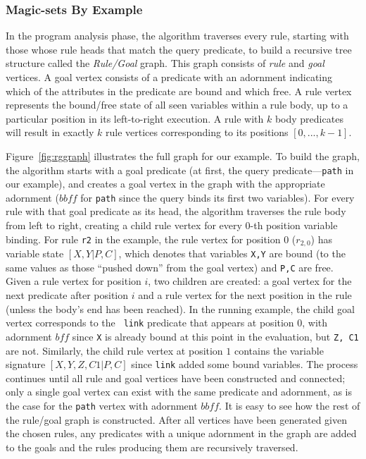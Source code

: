 \documentclass{sigmod08}
\newcommand{\ol}[1]{\texttt{\small #1}\xspace}
\begin{document}
\subsubsection{Magic-sets By Example}

In the program analysis phase, the algorithm traverses every rule,
starting with those whose rule heads that match the query predicate, to build
a recursive tree structure called the {\em Rule/Goal} graph. This graph
consists of \emph{rule} and \emph{goal} vertices.  A goal
vertex consists of a predicate with an
adornment indicating which of the attributes in the predicate
are bound and which free.  A rule vertex represents the bound/free state of
all seen variables within a rule body, up to a particular position in its
left-to-right execution. A rule with $k$ body predicates will
result in exactly $k$ rule vertices corresponding to its positions
$[0,...,k-1]$.

Figure~\ref{fig:rggraph} illustrates the full graph for our example.  To
build the graph, the algorithm starts with a goal predicate (at first,
the query predicate---\ol{path} in our example), and creates a goal
vertex in the graph with the appropriate adornment ($\mathit{bbff}$ for
\ol{path} since the query binds its first two variables). For every
rule with that goal predicate as its head, the algorithm traverses the
rule body from left to right, creating a child rule vertex for every
$0$-th position variable binding.  For rule \ol{r2} in the example, the
rule vertex for position $0$ ($r_{2,0}$) has variable state $[X,Y|P,C]$,
which denotes that variables \ol{X,Y} are bound (to the same values as
those ``pushed down'' from the goal vertex) and \ol{P,C} are free.
Given a rule vertex for position $i$, two children are created: a goal
vertex for the next predicate after position $i$ and a rule vertex for
the next position in the rule (unless the body's end has been reached).
In the running example, the child goal vertex corresponds to the {\tt
link} predicate that appears at position $0$, with adornment
$\mathit{bff}$ since \ol{X} is already bound at this point in the
evaluation, but \ol{Z, C1} are not.  Similarly, the child rule vertex
at position $1$ contains the variable signature $[X,Y,Z,C1|P,C]$ since
\ol{link} added some bound variables.  The process continues until all
rule and goal vertices have been constructed and connected; 
only a single goal vertex can exist with the same predicate and
adornment, as is the case for the \ol{path} vertex with adornment
$\mathit{bbff}$.   It is easy to see how the rest
of the rule/goal graph is constructed. After all vertices have been
generated given the chosen rules, any predicates with a unique adornment
in the graph are added to the goals and the rules producing them are
recursively traversed.
\end{document}
